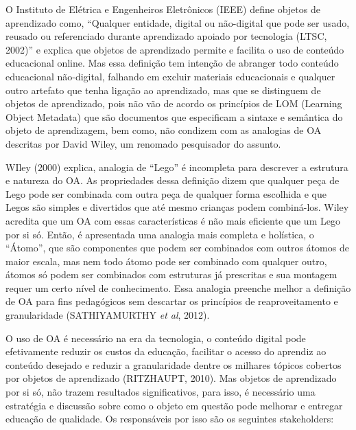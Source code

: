 \documentclass[12pt,openright,oneside,a4paper,english,french,spanish,brazil]{unifil}
\begin{document}
\par O Instituto de Elétrica e Engenheiros Eletrônicos (IEEE) define objetos de aprendizado como, ``Qualquer entidade, digital ou não-digital que pode ser usado, reusado ou referenciado durante aprendizado apoiado por tecnologia (LTSC, 2002)'' e explica que objetos de aprendizado permite e facilita o uso de conteúdo educacional online. Mas essa definição tem intenção de abranger todo conteúdo educacional não-digital, falhando em excluir materiais educacionais e qualquer outro artefato que tenha ligação ao aprendizado, mas que se distinguem de objetos de aprendizado, pois não vão de acordo os princípios de LOM (Learning Object Metadata) que são documentos que especificam a sintaxe e semântica do objeto de aprendizagem, bem como, não condizem com as analogias de OA descritas por David Wiley, um renomado pesquisador do assunto.
\par WIley (2000) explica, analogia de ``Lego'' é incompleta para descrever a estrutura e natureza do OA. As propriedades dessa definição dizem que qualquer peça de Lego pode ser combinada com outra peça de qualquer forma escolhida e que Legos são simples e divertidos que até mesmo crianças podem combiná-los. Wiley acredita que um OA com essas características é não mais eficiente que um Lego por si só. Então, é apresentada uma analogia mais completa e holística, o ``Átomo'', que são componentes que podem ser combinados com outros átomos de maior escala, mas nem todo átomo pode ser combinado com qualquer outro, átomos só podem ser combinados com estruturas já prescritas e sua montagem requer um certo nível de conhecimento. Essa analogia preenche melhor a definição de OA para fins pedagógicos sem descartar os princípios de reaproveitamento e granularidade (\uppercase{Sathiyamurthy} \textit{et al}, 2012).

O uso de OA é necessário na era da tecnologia, o conteúdo digital pode efetivamente reduzir os custos da educação, facilitar o acesso do aprendiz ao conteúdo desejado e reduzir a granularidade dentre os milhares tópicos cobertos por objetos de aprendizado (\uppercase{Ritzhaupt}, 2010).
Mas objetos de aprendizado por si só, não trazem resultados significativos, para isso, é necessário uma estratégia e discussão sobre como o objeto em questão pode melhorar e entregar educação de qualidade. Os responsáveis por isso são os seguintes stakeholders:
\end{document}
